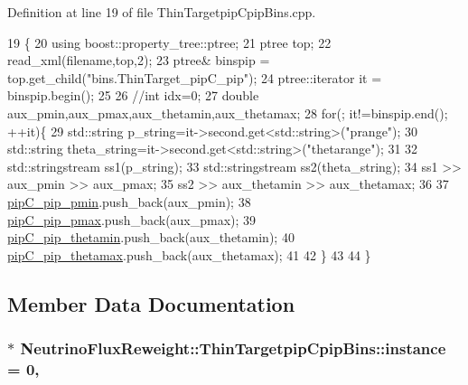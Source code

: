 Definition at line 19 of file Thin\-Targetpip\-Cpip\-Bins.\-cpp.


\begin{DoxyCode}
19                                                                    \{
20     \textcolor{keyword}{using} boost::property\_tree::ptree;
21     ptree top;    
22     read\_xml(filename,top,2); 
23     ptree& binspip = top.get\_child(\textcolor{stringliteral}{"bins.ThinTarget\_pipC\_pip"}); 
24     ptree::iterator it = binspip.begin();
25 
26 \textcolor{comment}{//int idx=0;}
27     \textcolor{keywordtype}{double} aux\_pmin,aux\_pmax,aux\_thetamin,aux\_thetamax;
28     \textcolor{keywordflow}{for}(; it!=binspip.end(); ++it)\{
29       std::string p\_string=it->second.get<std::string>(\textcolor{stringliteral}{"prange"});
30       std::string theta\_string=it->second.get<std::string>(\textcolor{stringliteral}{"thetarange"});
31 
32       std::stringstream ss1(p\_string);
33       std::stringstream ss2(theta\_string);
34       ss1 >> aux\_pmin >> aux\_pmax;
35       ss2 >> aux\_thetamin >> aux\_thetamax;
36 
37       \hyperlink{class_neutrino_flux_reweight_1_1_thin_targetpip_cpip_bins_a874e14ecf5a53ec934fbb5f9ed813592}{pipC\_pip\_pmin}.push\_back(aux\_pmin);
38       \hyperlink{class_neutrino_flux_reweight_1_1_thin_targetpip_cpip_bins_a6f8aa4a79f5c0aa512633d84ab822ac2}{pipC\_pip\_pmax}.push\_back(aux\_pmax);
39       \hyperlink{class_neutrino_flux_reweight_1_1_thin_targetpip_cpip_bins_ab77cf82bfaa42b9b08dae91f4f1a0a0d}{pipC\_pip\_thetamin}.push\_back(aux\_thetamin);
40       \hyperlink{class_neutrino_flux_reweight_1_1_thin_targetpip_cpip_bins_aa6811f55516db221df561b1fe1bfd6f0}{pipC\_pip\_thetamax}.push\_back(aux\_thetamax);
41 
42     \}
43 
44  \}
\end{DoxyCode}


\subsection{Member Data Documentation}
\hypertarget{class_neutrino_flux_reweight_1_1_thin_targetpip_cpip_bins_adde6da04efd43d2fe69c4adfb0c33008}{
\subsubsection[{instance}]{ $\ast$ Neutrino\-Flux\-Reweight\-::\-Thin\-Targetpip\-Cpip\-Bins\-::instance = 0\hspace{0.3cm}{\ttfamily [static]}, {\ttfamily [private]}}}\label{class_neutrino_flux_reweight_1_1_thin_targetpip_cpip_bins_adde6da04efd43d2fe69c4adfb0c33008}


